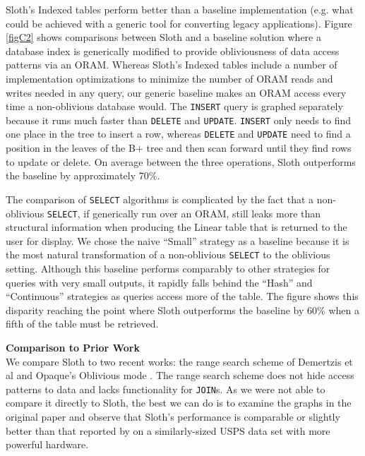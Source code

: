 \documentclass[USenglish,oneside,twocolumn]{article}
\def\name/{Sloth}
\begin{document}
\name/'s Indexed tables perform better than a baseline implementation (e.g. what could be achieved with a generic tool for converting legacy applications). Figure \ref{figC2} shows comparisons between \name/ and a baseline solution where a database index is generically modified to provide obliviousness of data access patterns via an ORAM. Whereas \name/'s Indexed tables include a number of implementation optimizations to minimize the number of ORAM reads and writes needed in any query, our generic baseline makes an ORAM access every time a non-oblivious database would. The \texttt{INSERT} query is graphed separately because it runs much faster than \texttt{DELETE} and \texttt{UPDATE}. \texttt{INSERT} only needs to find one place in the tree to insert a row, whereas \texttt{DELETE} and \texttt{UPDATE} need to find a position in the leaves of the B+ tree and then scan forward until they find rows to update or delete. On average between the three operations, \name/ outperforms the baseline by approximately 70\%. 

The comparison of \texttt{SELECT} algorithms is complicated by the fact that a non-oblivious \texttt{SELECT}, if generically run over an ORAM, still leaks more than structural information when producing the Linear table that is returned to the user for display. We chose the naive ``Small'' strategy as a baseline because it is the most natural transformation of a non-oblivious \texttt{SELECT} to the oblivious setting. Although this baseline performs comparably to other strategies for queries with very small outputs, it rapidly falls behind the ``Hash'' and ``Continuous'' strategies as queries access more of the table. The figure shows this disparity reaching the point where \name/ outperforms the baseline by 60\% when a fifth of the table must be retrieved. 

\medskip \noindent \textbf{Comparison to Prior Work}\\

We compare \name/ to two recent works: the range search scheme of Demertzis et al \cite{DPP+16} and Opaque's Oblivious mode \cite{ZDB+17}. The range search scheme does not hide access patterns to data and lacks functionality for \texttt{JOIN}s. As we were not able to compare it directly to \name/, the best we can do is to examine the graphs in the original paper and observe that \name/'s performance is comparable or slightly better than that reported by \cite{DPP+16} on a similarly-sized USPS data set with more powerful hardware. 
\end{document}
